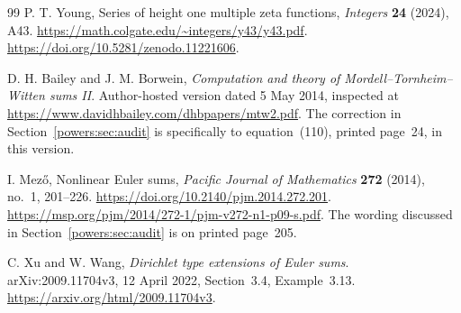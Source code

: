 \documentclass[11pt,a4paper]{article}
\numberwithin{equation}{section}
\theoremstyle{definition}
\theoremstyle{remark}
\begin{document}
\begin{thebibliography}{99}
P. T. Young,
Series of height one multiple zeta functions,
\emph{Integers} \textbf{24} (2024), A43.
\url{https://math.colgate.edu/~integers/y43/y43.pdf}.
\url{https://doi.org/10.5281/zenodo.11221606}.

D. H. Bailey and J. M. Borwein,
\emph{Computation and theory of Mordell--Tornheim--Witten sums II}.
Author-hosted version dated 5 May 2014, inspected at
\url{https://www.davidhbailey.com/dhbpapers/mtw2.pdf}.
The correction in Section~\ref{powers:sec:audit} is specifically to
equation~(110), printed page~24, in this version.

I. Mez\H{o}, Nonlinear Euler sums,
\emph{Pacific Journal of Mathematics} \textbf{272} (2014), no.~1,
201--226.
\url{https://doi.org/10.2140/pjm.2014.272.201}.
\url{https://msp.org/pjm/2014/272-1/pjm-v272-n1-p09-s.pdf}.
The wording discussed in Section~\ref{powers:sec:audit} is on
printed page~205.

C. Xu and W. Wang,
\emph{Dirichlet type extensions of Euler sums}.
arXiv:2009.11704v3, 12 April 2022,
Section~3.4, Example~3.13.
\url{https://arxiv.org/html/2009.11704v3}.

\end{thebibliography}
\end{document}
